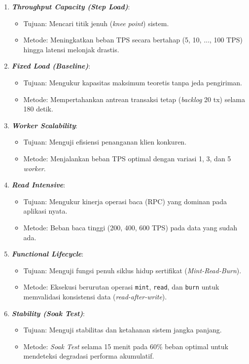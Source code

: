\begin{enumerate}
    \item \textbf{\textit{Throughput Capacity (Step Load)}}:
    \begin{itemize}
        \item Tujuan: Mencari titik jenuh (\textit{knee point}) sistem.
        \item Metode: Meningkatkan beban TPS secara bertahap (5, 10, ..., 100 TPS) hingga latensi melonjak drastis.
    \end{itemize}

    \item \textbf{\textit{Fixed Load (Baseline)}}:
    \begin{itemize}
        \item Tujuan: Mengukur kapasitas maksimum teoretis tanpa jeda pengiriman.
        \item Metode: Mempertahankan antrean transaksi tetap (\textit{backlog} 20 tx) selama 180 detik.
    \end{itemize}

    \item \textbf{\textit{Worker Scalability}}:
    \begin{itemize}
        \item Tujuan: Menguji efisiensi penanganan klien konkuren.
        \item Metode: Menjalankan beban TPS optimal dengan variasi 1, 3, dan 5 \textit{worker}.
    \end{itemize}

    \item \textbf{\textit{Read Intensive}}:
    \begin{itemize}
        \item Tujuan: Mengukur kinerja operasi baca (RPC) yang dominan pada aplikasi nyata.
        \item Metode: Beban baca tinggi (200, 400, 600 TPS) pada data yang sudah ada.
    \end{itemize}
    
    \item \textbf{\textit{Functional Lifecycle}}:
    \begin{itemize}
        \item Tujuan: Menguji fungsi penuh siklus hidup sertifikat (\textit{Mint-Read-Burn}).
        \item Metode: Eksekusi berurutan operasi \texttt{mint}, \texttt{read}, dan \texttt{burn} untuk memvalidasi konsistensi data (\textit{read-after-write}).
    \end{itemize}

    \item \textbf{\textit{Stability (Soak Test)}}:
    \begin{itemize}
        \item Tujuan: Menguji stabilitas dan ketahanan sistem jangka panjang.
        \item Metode: \textit{Soak Test} selama 15 menit pada 60\% beban optimal untuk mendeteksi degradasi performa akumulatif.
    \end{itemize}
\end{enumerate}

